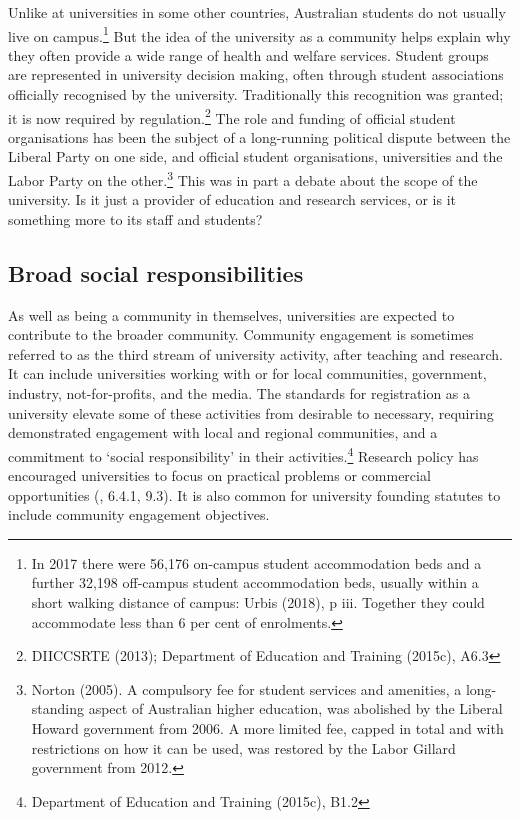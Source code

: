 \documentclass{grattan}
\begin{document}
Unlike at universities in some other countries, Australian students do not usually live on campus.\footnote{In 2017 there were 56,176 on-campus student accommodation beds and a further 32,198 off-campus student accommodation beds, usually within a short walking distance of campus: Urbis (2018), p iii. Together they could accommodate less than 6 per cent of enrolments.} But the idea of the university as a community helps explain why they often provide a wide range of health and welfare services. Student groups are represented in university decision making, often through student associations officially recognised by the university. Traditionally this recognition was granted; it is now required by regulation.\footnote{DIICCSRTE (2013); Department of Education and Training (2015c), A6.3} The role and funding of official student organisations has been the subject of a long-running political dispute between the Liberal Party on one side, and official student organisations, universities and the Labor Party on the other.\footnote{Norton (2005). A compulsory fee for student services and amenities, a long-standing aspect of Australian higher education, was abolished by the Liberal Howard government from 2006. A more limited fee, capped in total and with restrictions on how it can be used, was restored by the Labor Gillard government from 2012.} This was in part a debate about the scope of the university. Is it just a provider of education and research services, or is it something more to its staff and students?

%
\subsection{Broad social responsibilities }\label{subsec:broad-social-responsibilities}

As well as being a community in themselves, universities are expected to contribute to the broader community. Community engagement is sometimes referred to as the third stream of university activity, after teaching and research. It can include universities working with or for local communities, government, industry, not-for-profits, and the media. The standards for registration as a university elevate some of these activities from desirable to necessary, requiring demonstrated engagement with local and regional communities, and a commitment to `social responsibility' in their activities.\footnote{Department of Education and Training (2015c), B1.2} Research policy has encouraged universities to focus on practical problems or commercial opportunities (, 6.4.1, 9.3). It is also common for university founding statutes to include community engagement objectives.
\end{document}
